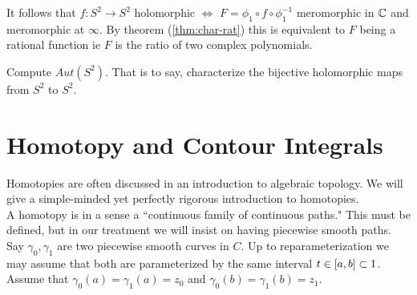 



































\begin{remark}
It follows that $f: S^2 \to S^2$ holomorphic $\iff$ $F=\phi_1 \circ f \circ \phi_1^{-1}$ meromorphic in $\mathbb{C}$ and meromorphic at $\infty$. By theorem (\ref{thm:char-rat}) this is equivalent to $F$ being a rational function ie $F$ is the ratio of two complex polynomials.
\end{remark}

\begin{exercise}
Compute $Aut(S^2)$. That is to say, characterize the bijective holomorphic maps from $S^2 $ to $S^2$.
\end{exercise}



\section{Homotopy and Contour Integrals}

Homotopies are often discussed in an introduction to algebraic topology. We will give a simple-minded yet perfectly rigorous introduction to homotopies.\\

A homotopy is in a sense a ``continuous family of continuous paths." This must be defined, but in our treatment we will insist on having piecewise smooth paths. Say $\gamma_0, \gamma_1$ are two piecewise smooth curves in $
C$. Up to reparameterization we may assume that both are parameterized by the same interval $t \in [a,b] \subset 1$. Assume that $\gamma_0(a) = \gamma_1(a) = z_0$ and $\gamma_0(b) = \gamma_1(b) = z_1$.

\begin{center}
\end{center}

